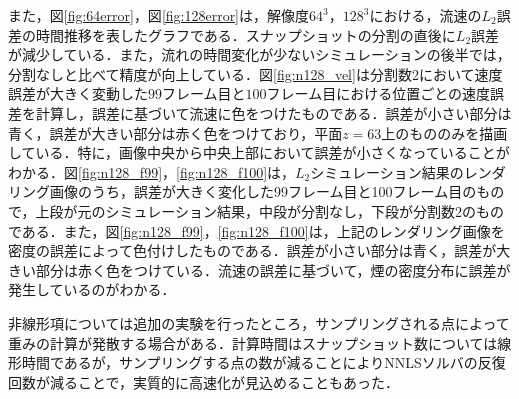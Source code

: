 \documentclass[a4j,12pt]{jreport}
\begin{document}
また，図\ref{fig:64error}，図\ref{fig:128error}は，解像度$64^3$，$128^3$における，流速の$L_2$誤差の時間推移を表したグラフである．スナップショットの分割の直後に$L_2$誤差が減少している．また，流れの時間変化が少ないシミュレーションの後半では，分割なしと比べて精度が向上している．図\ref{fig:n128_vel}は分割数2において速度誤差が大きく変動した$99$フレーム目と$100$フレーム目における位置ごとの速度誤差を計算し，誤差に基づいて流速に色をつけたものである．誤差が小さい部分は青く，誤差が大きい部分は赤く色をつけており，平面$z=63$上のもののみを描画している．特に，画像中央から中央上部において誤差が小さくなっていることがわかる．図\ref{fig:n128_f99}，\ref{fig:n128_f100}は，$L_2$シミュレーション結果のレンダリング画像のうち，誤差が大きく変化した99フレーム目と100フレーム目のもので，上段が元のシミュレーション結果，中段が分割なし，下段が分割数2のものである．また，図\ref{fig:n128_f99}，\ref{fig:n128_f100}は，上記のレンダリング画像を密度の誤差によって色付けしたものである．誤差が小さい部分は青く，誤差が大きい部分は赤く色をつけている．流速の誤差に基づいて，煙の密度分布に誤差が発生しているのがわかる．

非線形項については追加の実験を行ったところ，サンプリングされる点によって重みの計算が発散する場合がある．計算時間はスナップショット数については線形時間であるが，サンプリングする点の数が減ることによりNNLSソルバの反復回数が減ることで，実質的に高速化が見込めることもあった．


\end{document}
